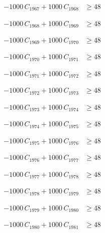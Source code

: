 \documentclass[a4paper,11pt]{article}
\begin{document}
\begin{align}
-1000\,C_{1967} + 1000\,C_{1968} &\geq 48 \nonumber
\end{align}

\begin{align}
-1000\,C_{1968} + 1000\,C_{1969} &\geq 48 \nonumber
\end{align}

\begin{align}
-1000\,C_{1969} + 1000\,C_{1970} &\geq 48 \nonumber
\end{align}

\begin{align}
-1000\,C_{1970} + 1000\,C_{1971} &\geq 48 \nonumber
\end{align}

\begin{align}
-1000\,C_{1971} + 1000\,C_{1972} &\geq 48 \nonumber
\end{align}

\begin{align}
-1000\,C_{1972} + 1000\,C_{1973} &\geq 48 \nonumber
\end{align}

\begin{align}
-1000\,C_{1973} + 1000\,C_{1974} &\geq 48 \nonumber
\end{align}

\begin{align}
-1000\,C_{1974} + 1000\,C_{1975} &\geq 48 \nonumber
\end{align}

\begin{align}
-1000\,C_{1975} + 1000\,C_{1976} &\geq 48 \nonumber
\end{align}

\begin{align}
-1000\,C_{1976} + 1000\,C_{1977} &\geq 48 \nonumber
\end{align}

\begin{align}
-1000\,C_{1977} + 1000\,C_{1978} &\geq 48 \nonumber
\end{align}

\begin{align}
-1000\,C_{1978} + 1000\,C_{1979} &\geq 48 \nonumber
\end{align}

\begin{align}
-1000\,C_{1979} + 1000\,C_{1980} &\geq 48 \nonumber
\end{align}

\begin{align}
-1000\,C_{1980} + 1000\,C_{1981} &\geq 48 \nonumber
\end{align}
\end{document}
